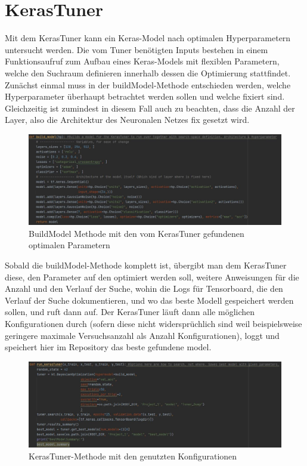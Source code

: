 \documentclass[letterpaper,10pt]{article}
\begin{document}
\section{KerasTuner}
    Mit dem KerasTuner\cite{OMalley.2019b} kann ein Keras-Model nach optimalen Hyperparametern untersucht werden. Die vom Tuner benötigten Inputs bestehen in einem Funktionsaufruf zum Aufbau eines Keras-Models mit flexiblen Parametern, welche den Suchraum definieren innerhalb dessen die Optimierung stattfindet. 
    Zunächst einmal muss in der buildModel-Methode entschieden werden, welche Hyperparameter überhaupt betrachtet werden sollen und welche fixiert sind. Gleichzeitig ist zumindest in diesem Fall auch zu beachten, dass die Anzahl der Layer, also die Architektur des Neuronalen Netzes fix gesetzt wird.
    \newline
    \begin{figure} [h!]
        \centering
        \includegraphics[width=\textwidth]{build_model.JPG}
        \caption{BuildModel Methode mit den vom KerasTuner gefundenen optimalen Parametern}
    \end{figure}
    \newpage
    Sobald die buildModel-Methode komplett ist, übergibt man dem KerasTuner diese, den Parameter auf den optimiert werden soll, weitere Anweisungen für die Anzahl und den Verlauf der Suche, wohin die Logs für Tensorboard, die den Verlauf der Suche dokumentieren, und wo das beste Modell gespeichert werden sollen, und ruft dann auf. Der KerasTuner läuft dann alle möglichen Konfigurationen durch (sofern diese nicht widersprüchlich sind weil beispielsweise geringere maximale Versuchsanzahl als Anzahl Konfigurationen), loggt und speichert hier im Repository das beste gefundene model. \\
     \begin{figure} [h!]
        \centering
        \includegraphics[width=\textwidth]{kerasTuner.JPG}
        \caption{KerasTuner-Methode mit den genutzten Konfigurationen}
    \end{figure}
\end{document}
